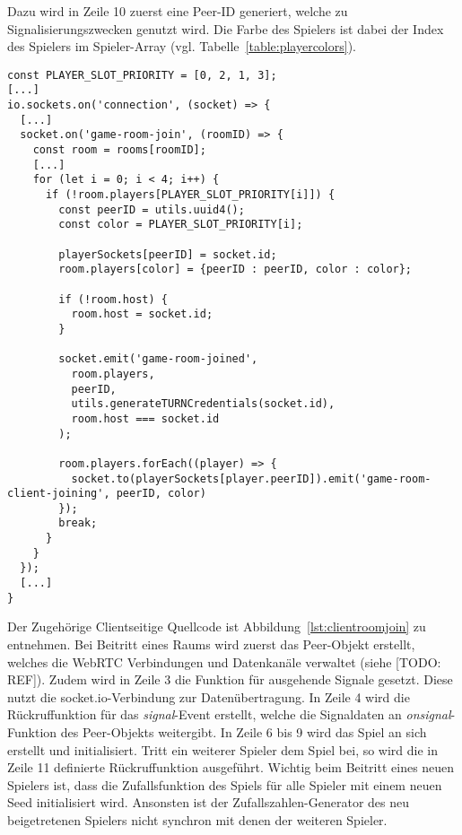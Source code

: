 Dazu wird in Zeile 10 zuerst eine Peer-ID generiert, welche zu Signalisierungszwecken genutzt wird. Die \glqq{}Farbe\grqq{} des Spielers ist dabei der Index des Spielers im Spieler-Array (vgl. Tabelle~\ref{table:playercolors}).\par

\vspace{11pt}
\lstset{language=js, style=STYLE_CODE_JS}
\begin{singlespace}
\begin{lstlisting}[caption={Event zum Betreten eines Raums -- Server.js}, captionpos=b, label={lst:join}]
const PLAYER_SLOT_PRIORITY = [0, 2, 1, 3];
[...]
io.sockets.on('connection', (socket) => {
  [...]
  socket.on('game-room-join', (roomID) => {
    const room = rooms[roomID];
    [...]
    for (let i = 0; i < 4; i++) {
      if (!room.players[PLAYER_SLOT_PRIORITY[i]]) {
        const peerID = utils.uuid4();
        const color = PLAYER_SLOT_PRIORITY[i];

        playerSockets[peerID] = socket.id;
        room.players[color] = {peerID : peerID, color : color};

        if (!room.host) {
          room.host = socket.id;
        }

        socket.emit('game-room-joined', 
          room.players, 
          peerID, 
          utils.generateTURNCredentials(socket.id), 
          room.host === socket.id
        );

        room.players.forEach((player) => {
          socket.to(playerSockets[player.peerID]).emit('game-room-client-joining', peerID, color)
        });
        break;
      }
    }
  });
  [...]
}
\end{lstlisting}
\end{singlespace}

Der Zugehörige Clientseitige Quellcode ist Abbildung~\ref{lst:clientroomjoin} zu entnehmen. Bei Beitritt eines Raums wird zuerst das Peer-Objekt erstellt, welches die \acs{WebRTC} Verbindungen und Datenkanäle verwaltet (siehe [TODO: REF]). Zudem wird in Zeile 3 die Funktion für ausgehende Signale gesetzt. Diese nutzt die socket.io-Verbindung zur Datenübertragung. In Zeile 4 wird die Rückruffunktion für das \textit{signal}-Event erstellt, welche die Signaldaten an \textit{onsignal}-Funktion des Peer-Objekts weitergibt. In Zeile 6 bis 9 wird das Spiel an sich erstellt und initialisiert. Tritt ein weiterer Spieler dem Spiel bei, so wird die in Zeile 11 definierte Rückruffunktion ausgeführt. Wichtig beim Beitritt eines neuen Spielers ist, dass die Zufallsfunktion des Spiels für alle Spieler mit einem neuen Seed initialisiert wird. Ansonsten ist der Zufallszahlen-Generator des neu beigetretenen Spielers nicht synchron mit denen der weiteren Spieler.

